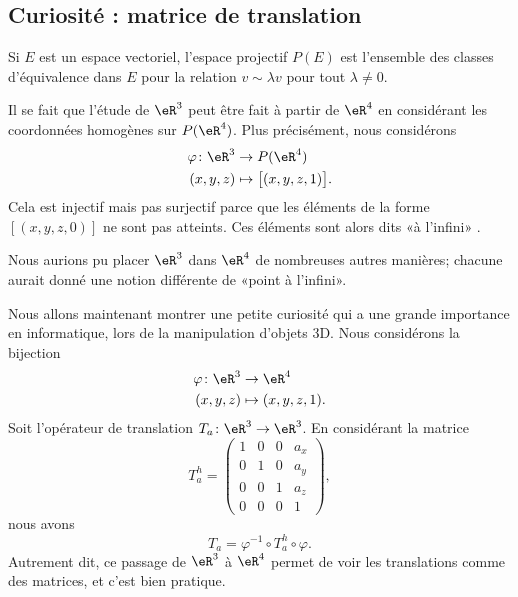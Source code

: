 \subsection{Curiosité : matrice de translation}

Si \( E\) est un espace vectoriel, l'espace projectif \( P(E)\) est l'ensemble des classes d'équivalence dans \( E\) pour la relation \( v\sim \lambda v\) pour tout \( \lambda\neq 0\).

Il se fait que l'étude de \( \eR^3\) peut être fait à partir de \( \eR^4\) en considérant les coordonnées homogènes sur \( P(\eR^4)\). Plus précisément, nous considérons
\begin{equation}
    \begin{aligned}
        \varphi\colon \eR^3&\to P(\eR^4) \\
        (x,y,z)&\mapsto \big[ (x,y,z,1) \big]. 
    \end{aligned}
\end{equation}
Cela est injectif mais pas surjectif parce que les éléments de la forme \( [(x,y,z,0)]\) ne sont pas atteints. Ces éléments sont alors dits «à l'infini» .

Nous aurions pu placer \( \eR^3\) dans \( \eR^4\) de nombreuses autres manières; chacune aurait donné une notion différente de «point à l'infini».

Nous allons maintenant montrer une petite curiosité qui a une grande importance en informatique, lors de la manipulation d'objets 3D. Nous considérons la bijection
\begin{equation}
    \begin{aligned}
        \varphi\colon \eR^3&\to \eR^4 \\
        (x,y,z)&\mapsto (x,y,z,1).
    \end{aligned}
\end{equation}
Soit l'opérateur de translation \( T_a\colon \eR^3\to \eR^3\). En considérant la matrice
\begin{equation}
    T^h_a=\begin{pmatrix}
         1   &   0    &   0    &   a_x    \\
         0   &   1    &   0    &   a_y    \\
         0   &   0    &   1    &   a_z    \\ 
         0   &   0    &   0    &   1     
     \end{pmatrix},
\end{equation}
nous avons
\begin{equation}
    T_a=\varphi^{-1}\circ T_a^h\circ \varphi.
\end{equation}
Autrement dit, ce passage de \( \eR^3\) à \( \eR^4\) permet de voir les translations comme des matrices, et c'est bien pratique.


